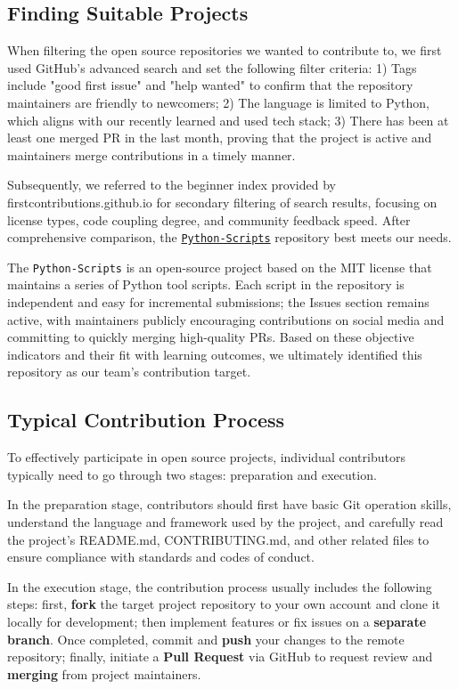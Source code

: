 \documentclass[12pt]{article}
\begin{document}
\subsection{Finding Suitable Projects}
When filtering the open source repositories we wanted to contribute to, we first used GitHub's advanced search and set the following filter criteria: 1) Tags include "good first issue" and "help wanted" to confirm that the repository maintainers are friendly to newcomers; 2) The language is limited to Python, which aligns with our recently learned and used tech stack; 3) There has been at least one merged PR in the last month, proving that the project is active and maintainers merge contributions in a timely manner. 

Subsequently, we referred to the beginner index provided by firstcontributions.github.io for secondary filtering of search results, focusing on license types, code coupling degree, and community feedback speed. After comprehensive comparison, the \href{https://github.com/DhanushNehru/Python-Scripts}{\texttt{Python-Scripts}} repository best meets our needs. 

The \texttt{Python-Scripts} is an open-source project based on the MIT license that maintains a series of Python tool scripts. Each script in the repository is independent and easy for incremental submissions; the Issues section remains active, with maintainers publicly encouraging contributions on social media and committing to quickly merging high-quality PRs. Based on these objective indicators and their fit with learning outcomes, we ultimately identified this repository as our team's contribution target.


\subsection{Typical Contribution Process}
To effectively participate in open source projects, individual contributors typically need to go through two stages: preparation and execution. 

In the preparation stage, contributors should first have basic Git operation skills, understand the language and framework used by the project, and carefully read the project's README.md, CONTRIBUTING.md, and other related files to ensure compliance with standards and codes of conduct. 

In the execution stage, the contribution process usually includes the following steps: first, \textbf{fork} the target project repository to your own account and clone it locally for development; then implement features or fix issues on a \textbf{separate branch}. Once completed, commit and \textbf{push} your changes to the remote repository; finally, initiate a \textbf{Pull Request} via GitHub to request review and \textbf{merging} from project maintainers. 
\end{document}
